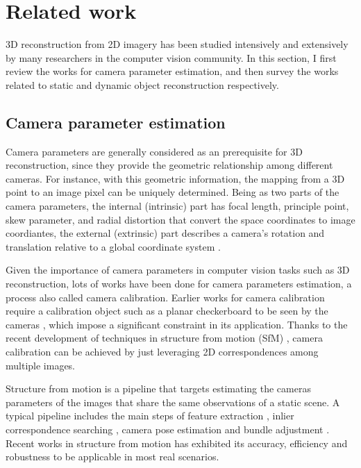 \chapter{Related work}

3D reconstruction from 2D imagery has been studied intensively and extensively by many researchers in the computer vision community. In this section, I first review the works for camera parameter estimation, and then survey the works related to static and dynamic object reconstruction respectively.

\section{Camera parameter estimation}
Camera parameters are generally considered as an prerequisite for 3D reconstruction, since they provide the geometric relationship among different cameras. For instance, with this geometric information, the mapping from a 3D point to an image pixel can be uniquely determined.
Being as two parts of the camera parameters, the internal (intrinsic) part has focal length, principle point, skew parameter, and radial distortion that convert the space coordinates to image coordiantes, the external (extrinsic) part describes a camera's rotation and translation relative to a global coordinate system \cite{Hartley2004}. 

Given the importance of camera parameters in computer vision tasks such as 3D reconstruction, lots of works have been done for camera parameters estimation, a process also called camera calibration. Earlier works for camera calibration require a calibration object such as a planar checkerboard to be seen by the cameras \cite{conf/cvpr/SturmM99,zhang2000flexible,caltoolbox}, which impose a significant constraint in its application. Thanks to the recent development of techniques in structure from motion (SfM) \cite{Snavely2,snavely2008modeling,WuVSFM,wilson2013network,heinly2014_duplicate_structure,schoenberger2015paige,Heinly,heinly_dissertation,zheng2015_structureless_resection}, camera calibration can be achieved by just leveraging 2D correspondences among multiple images. 

Structure from motion is a pipeline that targets estimating the cameras parameters of the images that share the same observations of a static scene. A typical pipeline includes the main steps of feature extraction \cite{lowe2004_sift,rublee2011_orb,bay2008_surf}, inlier correspondence searching \cite{raguram2013usac}, camera pose estimation \cite{nister2003_five_point,kneip2011novel,zheng2014general,zheng2015_structureless_resection} and bundle adjustment \cite{agarwal2010_ba,wu2011_multicore_ba}. Recent works  in structure from motion has exhibited its accuracy, efficiency and robustness to be applicable in most real scenarios.


